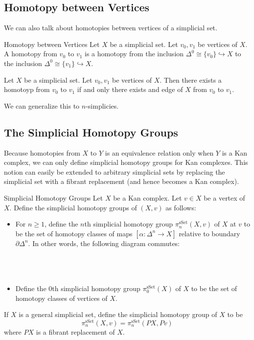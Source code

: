 \documentclass[a4paper]{article}
\begin{document}
\subsection{Homotopy between Vertices}
We can also talk about homotopies between vertices of a simplicial set. 

\begin{defn}{Homotopy between Vertices}{} Let $X$ be a simplicial set. Let $v_0,v_1$ be vertices of $X$. A homotopy from $v_0$ to $v_1$ is a homotopy from the inclusion $\Delta^0\cong\{v_0\}\hookrightarrow X$ to the inclusion $\Delta^0\cong\{v_1\}\hookrightarrow X$. 
\end{defn}

\begin{lmm}{}{} Let $X$ be a simplicial set. Let $v_0,v_1$ be vertices of $X$. Then there exists a homotoyp from $v_0$ to $v_1$ if and only there exists and edge of $X$ from $v_0$ to $v_1$. 
\end{lmm}

We can generalize this to $n$-simplicies. 

\subsection{The Simplicial Homotopy Groups}
Because homotopies from $X$ to $Y$ is an equivalence relation only when $Y$ is a Kan complex, we can only define simplicial homotopy groups for Kan complexes. This notion can easily be extended to arbitrary simplicial sets by replacing the simplicial set with a fibrant replacement (and hence becomes a Kan complex). 

\begin{defn}{Simplicial Homotopy Groups}{} Let $X$ be a Kan complex. Let $v\in X$ be a vertex of $X$. Define the simplicial homotopy groups of $(X,v)$ as follows: 
\begin{itemize}
\item For $n\geq 1$, define the $n$th simplicial homotopy group $\pi_n^\text{sSet}(X,v)$ of $X$ at $v$ to be the set of homotopy classes of maps $[\alpha:\Delta^n\to X]$ relative to boundary $\partial\Delta^n$. In other words, the following diagram commutes: \\~\\
\\~\\
\item Define the $0$th simplicial homotopy group $\pi_0^\text{sSet}(X)$ of $X$ to be the set of homotopy classes of vertices of $X$. 
\end{itemize}
If $X$ is a general simplicial set, define the simplicial homotopy group of $X$ to be $$\pi_n^\text{sSet}(X,v)=\pi_n^\text{sSet}(PX,Pv)$$ where $PX$ is a fibrant replacement of $X$. 
\end{defn}
\end{document}
